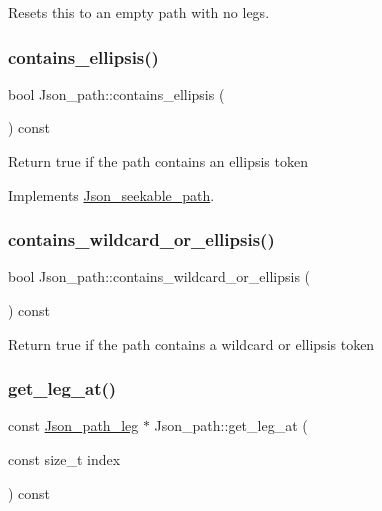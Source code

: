 Resets this to an empty path with no legs. \mbox{\label{classJson__path_a6f1be7ddf18da788f48e031a7b65c5f3}} 
\subsubsection{\texorpdfstring{contains\+\_\+ellipsis()}{contains\_ellipsis()}}
{\footnotesize\ttfamily bool Json\+\_\+path\+::contains\+\_\+ellipsis (\begin{DoxyParamCaption}{ }\end{DoxyParamCaption}) const\hspace{0.3cm}{\ttfamily [virtual]}}

Return true if the path contains an ellipsis token 

Implements \mbox{\hyperlink{classJson__seekable__path_a3c853224d800bf230962d9521fe466d9}{Json\+\_\+seekable\+\_\+path}}.

\mbox{\label{classJson__path_a4c0337db67e99b1fa92862afb06c1517}} 
\subsubsection{\texorpdfstring{contains\+\_\+wildcard\+\_\+or\+\_\+ellipsis()}{contains\_wildcard\_or\_ellipsis()}}
{\footnotesize\ttfamily bool Json\+\_\+path\+::contains\+\_\+wildcard\+\_\+or\+\_\+ellipsis (\begin{DoxyParamCaption}{ }\end{DoxyParamCaption}) const}

Return true if the path contains a wildcard or ellipsis token \mbox{\label{classJson__path_a33038f8cae772c5f4c8333be94389b46}} 
\subsubsection{\texorpdfstring{get\+\_\+leg\+\_\+at()}{get\_leg\_at()}}
{\footnotesize\ttfamily const \mbox{\hyperlink{classJson__path__leg}{Json\+\_\+path\+\_\+leg}} $\ast$ Json\+\_\+path\+::get\+\_\+leg\+\_\+at (\begin{DoxyParamCaption}\item[{const size\+\_\+t}]{index }\end{DoxyParamCaption}) const\hspace{0.3cm}{\ttfamily [virtual]}}

